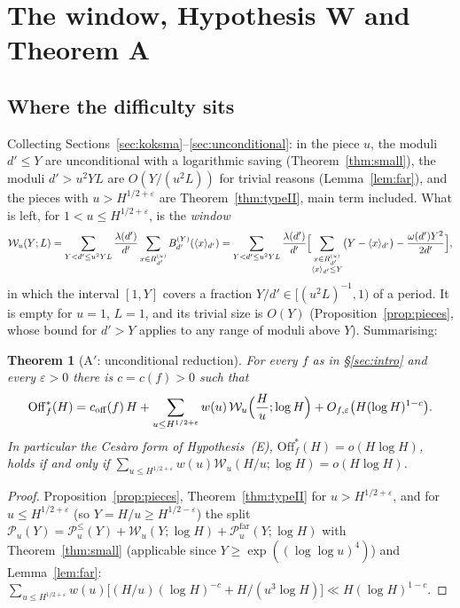 \documentclass[11pt,a4paper]{article}
\newtheorem{theorem}{Theorem}
\theoremstyle{remark}\newtheorem{remark}[theorem]{Remark}
\newcommand{\Off}{\mathrm{Off}}\newcommand{\e}{\mathrm{e}}
\newcommand{\rep}[2]{\langle #1\rangle_{#2}}
\begin{document}
\section{The window, Hypothesis W and Theorem A}\label{sec:W}

\subsection{Where the difficulty sits}

Collecting Sections~\ref{sec:koksma}--\ref{sec:unconditional}: in the piece $u$, the moduli $d'\le Y$ are
unconditional with a logarithmic saving (Theorem~\ref{thm:small}), the moduli $d'>u^2YL$ are $O(Y/(u^2L))$
for trivial reasons (Lemma~\ref{lem:far}), and the pieces with $u>H^{1/2+\varepsilon}$ are Theorem~\ref{thm:typeII},
main term included. What is left, for $1<u\le H^{1/2+\varepsilon}$, is the \emph{window}
\begin{equation}\label{eq:window}
\mathcal W_u(Y;L)=\sum_{Y<d'\le u^2YL}\frac{\lambda(d')}{d'}\sum_{x\in R^{(u)}_{d'}}B^{(Y)}_{d'}(\rep x{d'})
=\sum_{Y<d'\le u^2YL}\frac{\lambda(d')}{d'}\Bigl[\sum_{\substack{x\in R^{(u)}_{d'}\\ \rep x{d'}\le Y}}\bigl(Y-\rep x{d'}\bigr)-\frac{\omega(d')Y^2}{2d'}\Bigr],
\end{equation}
in which the interval $[1,Y]$ covers a fraction $Y/d'\in[(u^2L)^{-1},1)$ of a period. It is empty for $u=1$,
$L=1$, and its trivial size is $O(Y)$ (Proposition~\ref{prop:pieces}, whose bound for $d'>Y$ applies to any range of
moduli above $Y$). Summarising:

\begin{theorem}[A$'$: unconditional reduction]\label{thm:Aprime}
For every $f$ as in \S\ref{sec:intro} and every $\varepsilon>0$ there is $c=c(f)>0$ such that
\[
\Off^\ast_f(H)=c_{\mathrm{off}}(f)\,H+\sum_{u\le H^{1/2+\varepsilon}}w(u)\,\mathcal W_u\Bigl(\frac Hu;\log H\Bigr)+O_{f,\varepsilon}\bigl(H(\log H)^{1-c}\bigr).
\]
In particular the Ces\`aro form of Hypothesis~(E), $\Off^\ast_f(H)=o(H\log H)$, holds if and only if
$\sum_{u\le H^{1/2+\varepsilon}}w(u)\mathcal W_u(H/u;\log H)=o(H\log H)$.
\end{theorem}
\begin{proof}
Proposition~\ref{prop:pieces}, Theorem~\ref{thm:typeII} for $u>H^{1/2+\varepsilon}$, and for $u\le H^{1/2+\varepsilon}$
(so $Y=H/u\ge H^{1/2-\varepsilon}$) the split $\mathcal P_u(Y)=\mathcal P^\le_u(Y)+\mathcal W_u(Y;\log H)+\mathcal P^{\mathrm{far}}_u(Y;\log H)$
with Theorem~\ref{thm:small} (applicable since $Y\ge\exp((\log\log u)^4)$) and Lemma~\ref{lem:far}:
$\sum_{u\le H^{1/2+\varepsilon}}w(u)\bigl[(H/u)(\log H)^{-c}+H/(u^3\log H)\bigr]\ll H(\log H)^{1-c}$.
\end{proof}
\end{document}
